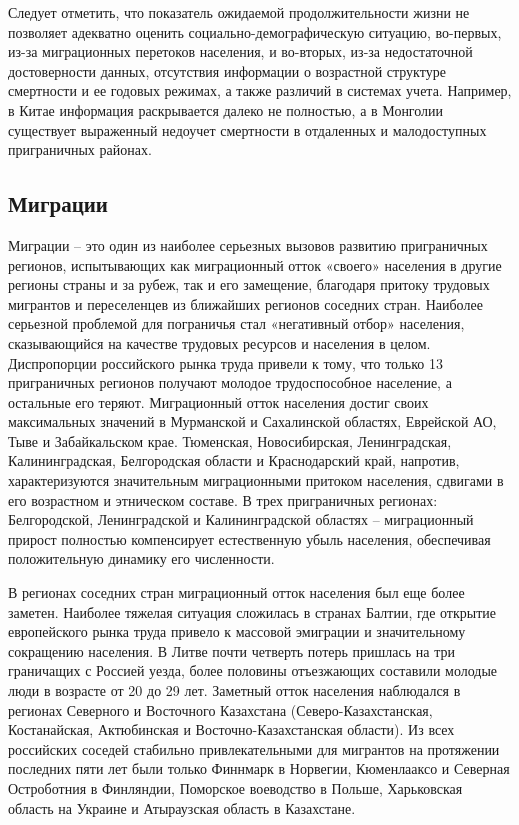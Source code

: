 \documentclass[]{book}
\begin{document}
Следует отметить, что показатель ожидаемой продолжительности жизни не
позволяет адекватно оценить социально-демографическую ситуацию,
во-первых, из-за миграционных перетоков населения, и во-вторых, из-за
недостаточной достоверности данных, отсутствия информации о возрастной
структуре смертности и ее годовых режимах, а также различий в системах
учета. Например, в Китае информация раскрывается далеко не полностью, а
в Монголии существует выраженный недоучет смертности в отдаленных и
малодоступных приграничных районах.

\subsection{Миграции}\label{demo-situ-mig}

Миграции -- это один из наиболее серьезных вызовов развитию приграничных
регионов, испытывающих как миграционный отток «своего» населения в
другие регионы страны и за рубеж, так и его замещение, благодаря притоку
трудовых мигрантов и переселенцев из ближайших регионов соседних стран.
Наиболее серьезной проблемой для пограничья стал «негативный отбор»
населения, сказывающийся на качестве трудовых ресурсов и населения в
целом. Диспропорции российского рынка труда привели к тому, что только
13 приграничных регионов получают молодое трудоспособное население, а
остальные его теряют. Миграционный отток населения достиг своих
максимальных значений в Мурманской и Сахалинской областях, Еврейской АО,
Тыве и Забайкальском крае. Тюменская, Новосибирская, Ленинградская,
Калининградская, Белгородская области и Краснодарский край, напротив,
характеризуются значительным миграционными притоком населения, сдвигами
в его возрастном и этническом составе. В трех приграничных регионах:
Белгородской, Ленинградской и Калининградской областях -- миграционный
прирост полностью компенсирует естественную убыль населения, обеспечивая
положительную динамику его численности.

В регионах соседних стран миграционный отток населения был еще более
заметен. Наиболее тяжелая ситуация сложилась в странах Балтии, где
открытие европейского рынка труда привело к массовой эмиграции и
значительному сокращению населения. В Литве почти четверть потерь
пришлась на три граничащих с Россией уезда, более половины отъезжающих
составили молодые люди в возрасте от 20 до 29 лет. Заметный отток
населения наблюдался в регионах Северного и Восточного Казахстана
(Северо-Казахстанская, Костанайская, Актюбинская и
Восточно-Казахстанская области). Из всех российских соседей стабильно
привлекательными для мигрантов на протяжении последних пяти лет были
только Финнмарк в Норвегии, Кюменлааксо и Северная Остроботния в
Финляндии, Поморское воеводство в Польше, Харьковская область на Украине
и Атыраузская область в Казахстане.
\end{document}
